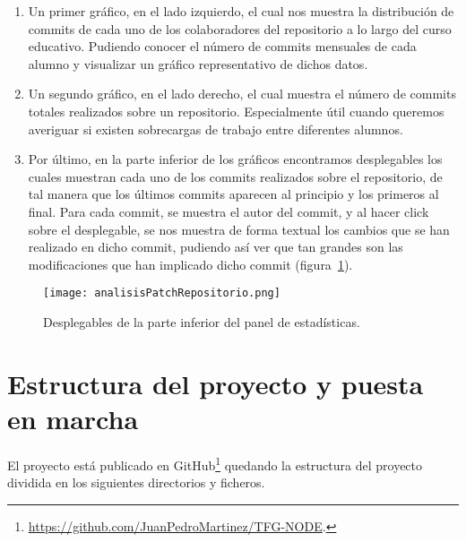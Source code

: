 \begin{enumerate}
\item Un primer gráfico, en el lado izquierdo, el cual nos muestra la
  distribución de commits de cada uno de los colaboradores del repositorio
  a lo largo del curso educativo. Pudiendo conocer el número de commits
  mensuales de cada alumno y visualizar un gráfico representativo de dichos
  datos.
\item Un segundo gráfico, en el lado derecho, el cual muestra el número de
  commits totales realizados sobre un repositorio. Especialmente útil
  cuando queremos averiguar si existen sobrecargas de trabajo entre
  diferentes alumnos.
\item Por último, en la parte inferior de los gráficos encontramos
  desplegables los cuales muestran cada uno de los commits realizados sobre
  el repositorio, de tal manera que los últimos commits aparecen al
  principio y los primeros al final. Para cada commit, se muestra el autor
  del commit, y al hacer click sobre el desplegable, se nos muestra de
  forma textual los cambios que se han realizado en dicho commit, pudiendo
  así ver que tan grandes son las modificaciones que han implicado dicho
  commit (figura~\ref{figure:imagenPatch}).
\end{enumerate}

\begin{figure}[h!]
  \texttt{[image: analisisPatchRepositorio.png]}
  \caption{Desplegables de la parte inferior del panel de estadísticas.}
  \label{figure:imagenPatch}
\end{figure}

\chapter{Estructura del proyecto y puesta en marcha\label{09EstructuraYpuesta}}

El proyecto está publicado en
GitHub\footnote{\url{https://github.com/JuanPedroMartinez/TFG-NODE}.}
quedando la estructura del proyecto dividida en los siguientes directorios
y ficheros.

